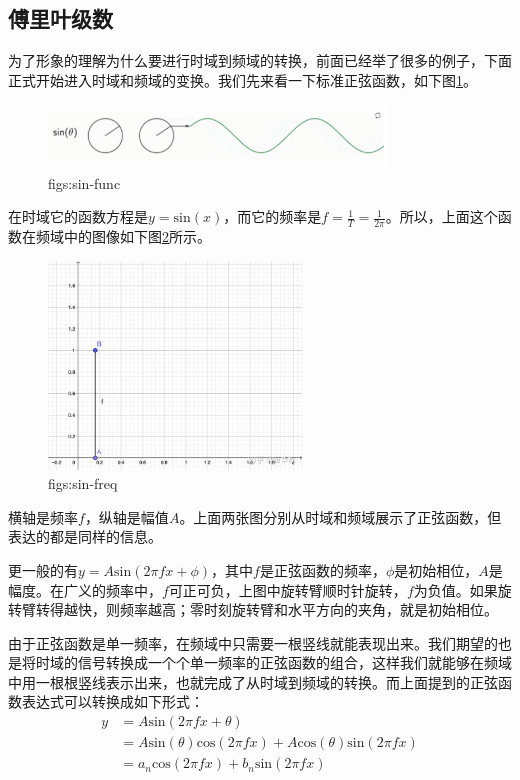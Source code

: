 \documentclass[lang=cn,11pt,a4paper,cite=numbers]{elegantpaper}
\begin{document}
\subsection{傅里叶级数}
  为了形象的理解为什么要进行时域到频域的转换，前面已经举了很多的例子，下面正式开始进入时域和频域的变换。我们先来看一下标准正弦函数，如下图\ref{figs:sin-func}。
\begin{figure}[!htb]
  \centering
  \includegraphics[width=0.8\textwidth]{figs/sin-func.png}
  \caption{figs:sin-func}
  \label{figs:sin-func}
\end{figure}
在时域它的函数方程是$y=\mathrm{sin}(x)$，而它的频率是$f=\frac{1}{T}=\frac{1}{2\pi}$。所以，上面这个函数在频域中的图像如下图\ref{figs:sin-freq}所示。
\begin{figure}[!htb]
  \centering
  \includegraphics[width=0.6\textwidth]{figs/sin-freq.png}
  \caption{figs:sin-freq}
  \label{figs:sin-freq}
\end{figure}
横轴是频率$f$，纵轴是幅值$A$。上面两张图分别从时域和频域展示了正弦函数，但表达的都是同样的信息。

  更一般的有$y=A\mathrm{sin}(2{\pi}fx+\phi)$，其中$f$是正弦函数的频率，$\phi$是初始相位，$A$是幅度。在广义的频率中，$f$可正可负，上图中旋转臂顺时针旋转，$f$为负值。如果旋转臂转得越快，则频率越高；零时刻旋转臂和水平方向的夹角，就是初始相位。

  由于正弦函数是单一频率，在频域中只需要一根竖线就能表现出来。我们期望的也是将时域的信号转换成一个个单一频率的正弦函数的组合，这样我们就能够在频域中用一根根竖线表示出来，也就完成了从时域到频域的转换。而上面提到的正弦函数表达式可以转换成如下形式：
\begin{equation}
  \begin{aligned}
    y&=A\mathrm{sin}(2{\pi}fx+\theta)\\
     &=A\mathrm{sin}(\theta)\mathrm{cos}(2{\pi}fx)+A\mathrm{cos}(\theta)\mathrm{sin}(2{\pi}fx)\\
     &=a_{n}\mathrm{cos}(2{\pi}fx)+b_{n}\mathrm{sin}(2{\pi}fx)
  \end{aligned}
\end{equation}
\end{document}
